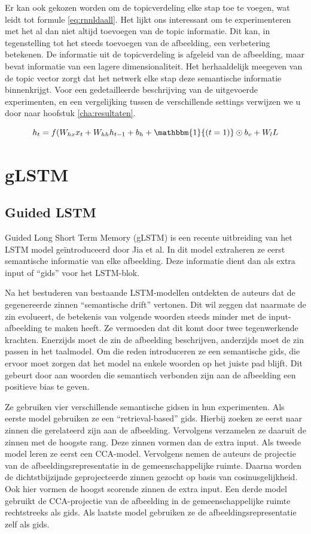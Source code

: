 Er kan ook gekozen worden om de topicverdeling elke stap toe te voegen, wat leidt tot formule \eqref{eq:rnnldaall}. Het lijkt ons interessant om te experimenteren met het al dan niet altijd toevoegen van de topic informatie. Dit kan, in tegenstelling tot het steeds toevoegen van de afbeelding, een verbetering betekenen. De informatie uit de topicverdeling is afgeleid van de afbeelding, maar bevat informatie van een lagere dimensionaliteit. Het herhaaldelijk meegeven van de topic vector zorgt dat het netwerk elke stap deze semantische informatie binnenkrijgt. Voor een gedetailleerde beschrijving van de uitgevoerde experimenten, en een vergelijking tussen de verschillende settings verwijzen we u door naar hoofstuk \ref{cha:resultaten}.


\begin{equation}
    h_t = f(W_{hx} x_{t} + W_{hh} h_{t-1} + b_h + \mathbbm{1}{(t=1)} \odot b_v + W_lL
    \label{eq:rnnldaall}
\end{equation}


\section{gLSTM}
\subsection{Guided LSTM}
Guided Long Short Term Memory (gLSTM) is een recente uitbreiding van het LSTM model ge\"introduceerd door Jia et al.\cite{Fernando2015} In dit model extraheren ze eerst semantische informatie van elke afbeelding. Deze informatie dient dan als extra input of ``gids'' voor het LSTM-blok.

Na het bestuderen van bestaande LSTM-modellen ontdekten de auteurs dat de gegenereerde zinnen ``semantische drift'' vertonen. Dit wil zeggen dat naarmate de zin evolueert, de betekenis van volgende woorden steeds minder met de input-afbeelding te maken heeft. Ze vermoeden dat dit komt door twee tegenwerkende krachten. Enerzijds moet de zin de afbeelding beschrijven, anderzijds moet de zin passen in het taalmodel. Om die reden introduceren ze een semantische gids, die ervoor moet zorgen dat het model na enkele woorden op het juiste pad blijft. Dit gebeurt door aan woorden die semantisch verbonden zijn aan de afbeelding een positieve bias te geven.

Ze gebruiken vier verschillende semantische gidsen in hun experimenten. Als eerste model gebruiken ze een ``retrieval-based'' gids. Hierbij zoeken ze eerst naar zinnen die gerelateerd zijn aan de afbeelding. Vervolgens verzamelen ze daaruit de zinnen met de hoogste rang. Deze zinnen vormen dan de extra input.
Als tweede model leren ze eerst een CCA-model. Vervolgens nemen de auteurs de projectie van de afbeeldingsrepresentatie in de gemeenschappelijke ruimte. Daarna worden de dichtstbijzijnde geprojecteerde zinnen gezocht op basis van cosinusgelijkheid. Ook hier vormen de hoogst scorende zinnen de extra input.
Een derde model gebruikt de CCA-projectie van de afbeelding in de gemeenschappelijke ruimte rechtstreeks als gids.
Als laatste model gebruiken ze de afbeeldingsrepresentatie zelf als gids.

